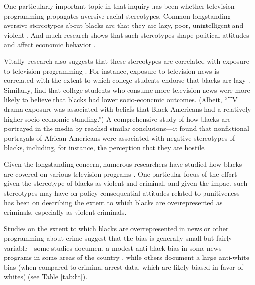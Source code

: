 \documentclass[12pt, letterpaper]{article}
\begin{document}
One particularly important topic in that inquiry has been whether television programming propagates aversive racial stereotypes. Common longstanding aversive stereotypes about blacks are that they are lazy, poor, unintelligent and violent \citep{katz1933racial}. And much research shows that such stereotypes shape political attitudes \citep{sniderman1995scar, hurwitz1997public, peffley1997racial, dixon2006psychological} and affect economic behavior \citep{bertrand2004emily}. 

Vitally, research also suggests that these stereotypes are correlated with exposure to television programming \citep{busselle2002television, entman2001black, armstrong1992tv}. For instance, exposure to television news is correlated with the extent to which college students endorse that blacks are lazy \citep{busselle2002television}. Similarly, \citet{armstrong1992tv} find that college students who consume more television news were more likely to believe that blacks had lower socio-economic outcomes. (Albeit, ``TV drama exposure was associated with beliefs that Black Americans had a relatively higher socio-economic standing.'') A comprehensive study of how blacks are portrayed in the media by \citet{entman2001black} reached similar conclusions---it found that nonfictional portrayals of African Americans were associated with negative stereotypes of blacks, including, for instance, the perception that they are hostile.

Given the longstanding concern, numerous researchers have studied how blacks are covered on various television programs \citep[for e.g.,][]{entman2001black, eschholz2004images}. One particular focus of the effort---given the stereotype of blacks as violent and criminal, and given the impact such stereotypes may have on policy consequential attitudes related to punitiveness---has been on describing the extent to which blacks are overrepresented as criminals, especially as violent criminals. 

Studies on the extent to which blacks are overrepresented in news or other programming about crime suggest that the bias is generally small but fairly variable---some studies document a modest anti-black bias in some news programs in some areas of the country \citep{gilliam1996crime}, while others document a large anti-white bias (when compared to criminal arrest data, which are likely biased in favor of whites) \citep{chiricos2002racial, dixon2000overrepresentation, eschholz2004images} (see Table \ref{tab:lit}). 


\end{document}

